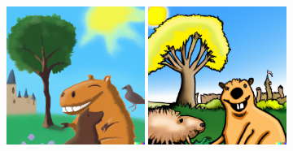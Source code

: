 \documentclass{article}
\newcommand{\imagewidthfactor}{0.4}
\begin{document}
\begin{figure}[h!]
\centering
\includegraphics[width=\imagewidthfactor\textwidth]{media/1a.png}
\quad
\includegraphics[width=\imagewidthfactor\textwidth]{media/1b.png}\\

\end{figure}
\end{document}
